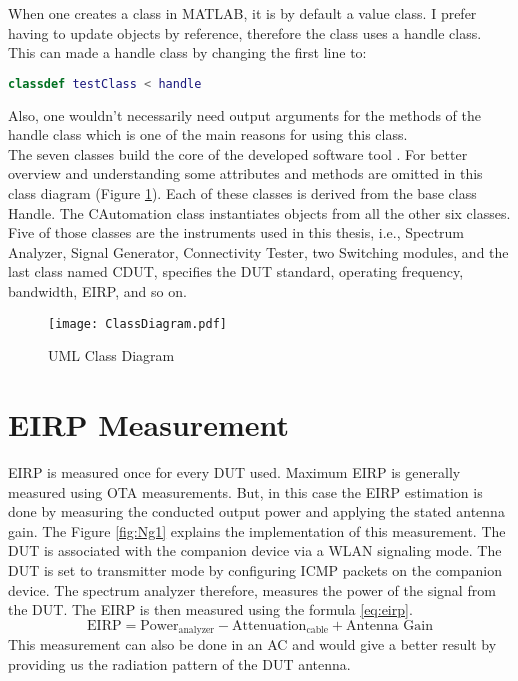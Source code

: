 When one creates a class in MATLAB\textregistered{}, it is by default a value class. I prefer having to update objects by reference, therefore the class uses a handle class. This can made a handle class by changing the first line to:
\begin{lstlisting}[language=MATLAB]
classdef testClass < handle
\end{lstlisting}
Also, one wouldn't necessarily need output arguments for the methods of the handle class which is one of the main reasons for using this class. \\

The seven classes build the core of the developed software tool . For better overview and understanding some attributes and methods are omitted in this class diagram (Figure \ref{fig:cd}). Each of these classes is derived from the base class Handle. The CAutomation class instantiates objects from all the other six classes. Five of those classes are the instruments used in this thesis, i.e., Spectrum Analyzer, Signal Generator, Connectivity Tester, two Switching modules, and the last class named CDUT, specifies the \acs{DUT} standard, operating frequency, bandwidth, \acs{EIRP}, and so on.

\begin{figure}[H]
\centering
\texttt{[image: ClassDiagram.pdf]}
\caption{UML Class Diagram}
\label{fig:cd} 
\end{figure}



\section{\acs{EIRP} Measurement}
\acs{EIRP} is measured once for every \acs{DUT} used. Maximum \acs{EIRP} is generally measured using \acs{OTA} measurements.  But, in this case the \acs{EIRP} estimation is done by measuring the conducted output power and applying the stated antenna gain. The Figure \ref{fig:Ng1} explains the implementation of this measurement. The \acs{DUT} is associated with the companion device via a \acs{WLAN} signaling mode. The \acs{DUT} is set to transmitter mode by configuring \acs{ICMP} packets on the companion device. The spectrum analyzer therefore, measures the power of the signal from the \acs{DUT}. The \acs{EIRP} is then measured using the formula \ref{eq:eirp}.
\begin{equation}
\mbox{EIRP}  = \mbox{Power}_{\mbox{analyzer}} - \mbox{Attenuation}_{\mbox{cable}} + \mbox{Antenna Gain} \label{eq:eirp}
\end{equation}
This measurement can also be done in an \acf{AC} and would give a better result by providing us the radiation pattern of the \acs{DUT} antenna.


